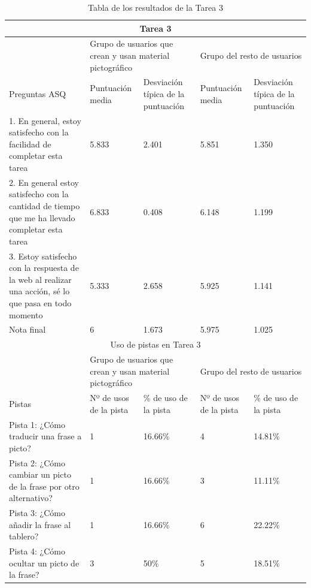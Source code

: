 \begin{table}
\begin{tabular}{ |p{4cm}|p{2cm}|p{2cm}|p{2cm}|p{2cm}|  }
	\hline
	\multicolumn{5}{|c|}{Tarea 3} \\
	\hline
	& \multicolumn{2}{|p{4cm}|}{Grupo de usuarios que crean y usan material pictográfico} & \multicolumn{2}{|p{4cm}|}{Grupo del resto de usuarios }  \\ 
	\hline
	Preguntas ASQ & Puntuación media  &Desviación típica de la puntuación & Puntuación media & Desviación típica de la puntuación\\
	\hline
	1. En general, estoy satisfecho con la facilidad de completar esta tarea &5.833  &2.401 &5.851  &1.350\\
	\hline
	2. En general estoy satisfecho con la cantidad de tiempo que me ha llevado completar esta tarea &6.833  &0.408 &6.148 &1.199\\
	\hline
	3. Estoy satisfecho con la respuesta de la web al realizar una acción, sé lo que pasa en todo momento &5.333 &2.658 &5.925  &1.141\\
	\hline
	Nota final &6 &1.673 &5.975 &1.025\\
	\hline
	\multicolumn{5}{|c|}{Uso de pistas en Tarea 3} \\
	\hline
	& \multicolumn{2}{|p{4cm}|}{Grupo de usuarios que crean y usan material pictográfico} & \multicolumn{2}{|p{4cm}|}{Grupo del resto de usuarios }  \\ 
	\hline
	Pistas &Nº de usos de la pista &\% de uso de la pista&Nº de usos de la pista&\% de uso de la pista\\
	\hline
	Pista 1: ¿Cómo traducir una frase a picto? &1  &16.66\% &4  &14.81\%\\
	\hline
	Pista 2: ¿Cómo cambiar un picto de la frase por otro alternativo? &1  &16.66\%  &3 &11.11\%\\
	\hline
	Pista 3: ¿Cómo añadir la frase al tablero? &1 &16.66\% &6   &22.22\%\\
	\hline
	Pista 4: ¿Cómo ocultar un picto de la frase? &3 &50\% &5   &18.51\%\\
	\hline

\end{tabular}
\caption{\label{tab:area3respuestas}Tabla de los resultados de la Tarea 3}
\end{table}


